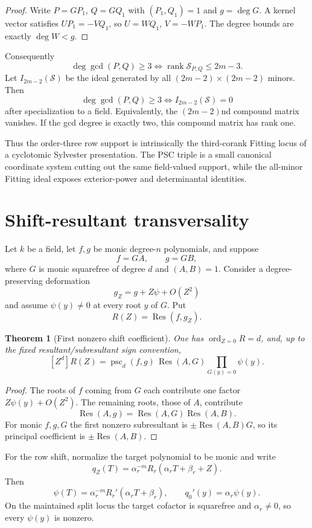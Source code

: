 \documentclass[11pt]{article}
\newtheorem{theorem}{Theorem}[section]
\newcommand{\Res}{\operatorname{Res}}
\newcommand{\ord}{\operatorname{ord}}
\begin{document}
\begin{proof}
Write $P=GP_1$, $Q=GQ_1$ with $(P_1,Q_1)=1$ and $g=\deg G$.  A kernel vector
satisfies $UP_1=-VQ_1$, so $U=WQ_1$, $V=-WP_1$.  The degree bounds are exactly
$\deg W<g$.
\end{proof}

Consequently
\[
\deg\gcd(P,Q)\ge3
\iff
\operatorname{rank}\mathcal S_{P,Q}\le2m-3.
\]
Let $I_{2m-2}(\mathcal S)$ be the ideal generated by all
$(2m-2)\times(2m-2)$ minors.  Then
\[
\deg\gcd(P,Q)\ge3
\iff I_{2m-2}(\mathcal S)=0
\]
after specialization to a field.  Equivalently, the
$(2m-2)$nd compound matrix vanishes.  If the gcd degree is exactly two, this
compound matrix has rank one.

Thus the order-three row support is intrinsically the third-corank Fitting
locus of a cyclotomic Sylvester presentation.  The PSC triple is a small
canonical coordinate system cutting out the same field-valued support, while
the all-minor Fitting ideal exposes exterior-power and determinantal identities.

\section{Shift-resultant transversality}

Let $k$ be a field, let $f,g$ be monic degree-$n$ polynomials, and suppose
\[
f=GA,\qquad g=GB,
\]
where $G$ is monic squarefree of degree $d$ and $(A,B)=1$.  Consider a
degree-preserving deformation
\[
g_Z=g+Z\psi+O(Z^2)
\]
and assume $\psi(y)\ne0$ at every root $y$ of $G$.  Put
\[
R(Z)=\Res(f,g_Z).
\]

\begin{theorem}[First nonzero shift coefficient]\label{thm:shift-psc}
One has $\ord_{Z=0}R=d$, and, up to the fixed resultant/subresultant sign
convention,
\[
[Z^d]R(Z)
 =\operatorname{psc}_d(f,g)\,
  \Res(A,G)\prod_{G(y)=0}\psi(y).
\]
\end{theorem}

\begin{proof}
The roots of $f$ coming from $G$ each contribute one factor
$Z\psi(y)+O(Z^2)$.  The remaining roots, those of $A$, contribute
\[
\Res(A,g)=\Res(A,G)\Res(A,B).
\]
For monic $f,g,G$ the first nonzero subresultant is
$\pm\Res(A,B)G$, so its principal coefficient is
$\pm\Res(A,B)$.
\end{proof}

For the row shift, normalize the target polynomial to be monic and write
\[
q_Z(T)=\alpha_r^{-m}
 R_r(\alpha_rT+\beta_r+Z).
\]
Then
\[
\psi(T)=\alpha_r^{-m}R_r'(\alpha_rT+\beta_r),
\qquad
q_0'(y)=\alpha_r\psi(y).
\]
On the maintained split locus the target cofactor is squarefree and
$\alpha_r\ne0$, so every $\psi(y)$ is nonzero.
\end{document}
